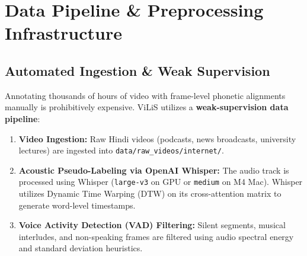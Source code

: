 \documentclass[11pt,a4paper]{article}
\begin{document}
\section{Data Pipeline \& Preprocessing Infrastructure}
\subsection{Automated Ingestion \& Weak Supervision}
Annotating thousands of hours of video with frame-level phonetic alignments manually is prohibitively expensive. ViLiS utilizes a \textbf{weak-supervision data pipeline}:
\begin{enumerate}
    \item \textbf{Video Ingestion:} Raw Hindi videos (podcasts, news broadcasts, university lectures) are ingested into \texttt{data/raw\_videos/internet/}.
    \item \textbf{Acoustic Pseudo-Labeling via OpenAI Whisper:} The audio track is processed using Whisper (\texttt{large-v3} on GPU or \texttt{medium} on M4 Mac). Whisper utilizes Dynamic Time Warping (DTW) on its cross-attention matrix to generate word-level timestamps.
    \item \textbf{Voice Activity Detection (VAD) Filtering:} Silent segments, musical interludes, and non-speaking frames are filtered using audio spectral energy and standard deviation heuristics.
\end{enumerate}
\end{document}
